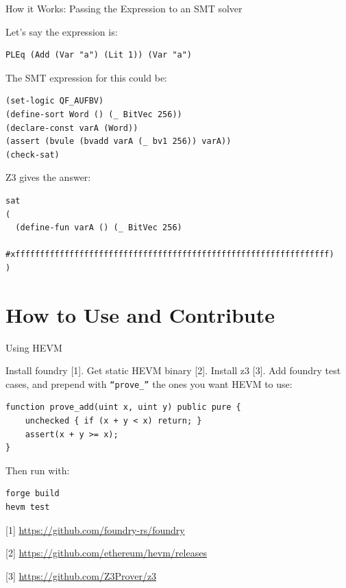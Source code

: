 \documentclass{beamer}
\begin{document}
\begin{frame}[fragile=singleslide]{How it Works: Passing the Expression to an SMT solver}

Let's say the expression is:

\begin{Verbatim}[frame=single, framerule=0.2mm, framesep=2mm,fontsize=\footnotesize]
PLEq (Add (Var "a") (Lit 1)) (Var "a")
\end{Verbatim}
\bigskip

The SMT expression for this could be:

\begin{Verbatim}[frame=single, framerule=0.2mm, framesep=2mm,fontsize=\footnotesize]
(set-logic QF_AUFBV)
(define-sort Word () (_ BitVec 256))
(declare-const varA (Word))
(assert (bvule (bvadd varA (_ bv1 256)) varA))
(check-sat)
\end{Verbatim}

Z3 gives the answer:

\begin{Verbatim}[frame=single, framerule=0.2mm, framesep=2mm,fontsize=\footnotesize]
sat
(
  (define-fun varA () (_ BitVec 256)
    #xffffffffffffffffffffffffffffffffffffffffffffffffffffffffffffffff)
)
\end{Verbatim}
\end{frame}

\section{How to Use and Contribute}
\begin{frame}[fragile=singleslide]{Using HEVM}

Install foundry [1]. Get static HEVM binary [2]. Install z3 [3]. Add foundry test cases, and prepend with \texttt{``prove\_''} the ones you want HEVM to use:

\begin{Verbatim}[frame=single, framerule=0.2mm, framesep=2mm,fontsize=\footnotesize]
function prove_add(uint x, uint y) public pure {
    unchecked { if (x + y < x) return; }
    assert(x + y >= x);
}
\end{Verbatim}

Then run with:

\begin{Verbatim}[frame=single, framerule=0.2mm, framesep=2mm,fontsize=\footnotesize]
forge build
hevm test
\end{Verbatim}


\bigskip

[1] \url{https://github.com/foundry-rs/foundry}

[2] \url{https://github.com/ethereum/hevm/releases}

[3] \url{https://github.com/Z3Prover/z3}
\end{frame}
\end{document}
